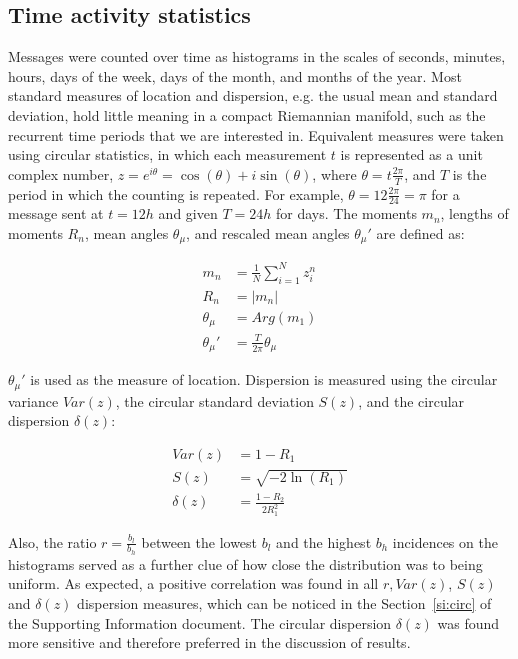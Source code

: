 \documentclass[%
	aip,
	jmp,%
	amsmath,amssymb,
	reprint,%
]{revtex4-1}
\begin{document}
\subsection{Time activity statistics}\label{sec:mtime}
Messages were counted over time as histograms in the scales of seconds,
minutes, hours, days of the week, days of the month, and months of the year.
Most standard measures of location and dispersion, e.g. the usual mean and
standard deviation, hold little meaning in a compact Riemannian manifold,
such as the recurrent time periods that we are interested in.
Equivalent measures were taken using circular statistics,
in which each measurement $t$ is represented as a unit complex number,
$z=e^{i\theta}=\cos(\theta)+i\sin(\theta)$, where $\theta=t\frac{2\pi}{T}$,
and $T$ is the period in which the counting is repeated.
For example, $\theta=12\frac{2\pi}{24}=\pi$ for a message sent at $t=12h$ and given $T=24h$ for days.
The moments $m_n$, lengths of moments $R_n$, mean angles $\theta_\mu$, and rescaled mean angles $\theta_\mu'$ are defined as:

\begin{align}\label{eq:cmom}
	m_n&=\frac{1}{N}\sum_{i=1}^N z_i^n \nonumber\\
	R_n&=|m_n|\\
	\theta_\mu&=Arg(m_1) \nonumber \\
	\theta_\mu'&=\frac{T}{2\pi} \theta_\mu \nonumber
\end{align}

$\theta_\mu'$ is used as the measure of location.
Dispersion is measured using the circular variance $Var(z)$,
the circular standard deviation $S(z)$, and the circular dispersion $\delta(z)$:

\begin{align}\label{eq:cmd}
	Var(z)&=1 - R_1 \nonumber\\
	S(z)&= \sqrt{-2\ln(R_1)}\\
	\delta(z)&=\frac{1-R_2}{2 R_1^2} \nonumber
\end{align}

\noindent
Also, the ratio $r=\frac{b_l}{b_h}$ between the lowest $b_l$ and the highest $b_h$ incidences on the histograms 
served as a further clue of how close the distribution was to being uniform.
As expected, a positive correlation was found in all $r, Var(z)$, $S(z)$ and $\delta(z)$ dispersion measures,
which can be noticed in the Section~\ref{si:circ} of the Supporting Information document.
The circular dispersion $\delta(z)$ was found more sensitive and therefore preferred 
in the discussion of results.
\end{document}
